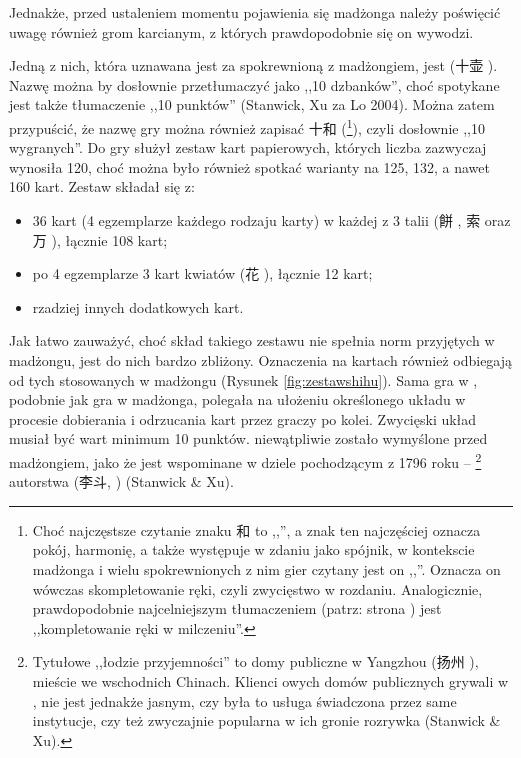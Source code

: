 Jednakże, przed ustaleniem momentu pojawienia się madżonga należy poświęcić
uwagę również grom karcianym, z których prawdopodobnie się on wywodzi.

Jedną z nich, która uznawana jest za spokrewnioną z madżongiem, jest
 (十壶 ). Nazwę można by dosłownie przetłumaczyć jako
,,10 dzbanków'', choć spotykane jest także tłumaczenie ,,10 punktów'' (Stanwick,
Xu za Lo 2004). Można zatem przypuścić, że nazwę gry można również zapisać 十和
(\footnote{Choć najczęstsze czytanie znaku 和 to ,,'', a
znak ten najczęściej oznacza pokój, harmonię, a także występuje w zdaniu jako
spójnik, w kontekscie madżonga i wielu spokrewnionych z nim gier czytany jest on
,,''. Oznacza on wówczas skompletowanie ręki, czyli zwycięstwo w
rozdaniu. Analogicznie, prawdopodobnie najcelniejszym tłumaczeniem 
(patrz: strona \pageref{mohu_page}) jest ,,kompletowanie ręki w milczeniu''.}),
czyli dosłownie ,,10 wygranych''. Do gry służył zestaw kart papierowych, których
liczba zazwyczaj wynosiła 120, choć można było również spotkać warianty na 125,
132, a nawet 160 kart. Zestaw składał się z:
\begin{itemize}
  \item 36 kart (4 egzemplarze każdego rodzaju karty) w każdej z 3 talii (餅
  , 索  oraz 万 ), łącznie 108 kart;
  \item po 4 egzemplarze 3 kart kwiatów (花 ), łącznie 12 kart;
  \item rzadziej innych dodatkowych kart.
\end{itemize}
Jak łatwo zauważyć, choć skład takiego zestawu nie spełnia norm przyjętych w
madżongu, jest do nich bardzo zbliżony. Oznaczenia na kartach również odbiegają
od tych stosowanych w madżongu (Rysunek \ref{fig:zestawshihu}).
Sama gra w , podobnie jak gra w madżonga, polegała na ułożeniu określonego układu w procesie
dobierania i odrzucania kart przez graczy po kolei. Zwycięski układ musiał być
wart minimum 10 punktów.  niewątpliwie zostało wymyślone przed
madżongiem, jako że jest wspominane w dziele pochodzącym z 1796 roku --
\label{li_dou}\footnote{Tytułowe
,,łodzie przyjemności'' to domy publiczne w Yangzhou (扬州 ), mieście we
wschodnich Chinach. Klienci owych domów publicznych grywali w ,
nie jest jednakże jasnym, czy była to usługa świadczona przez same instytucje,
czy też zwyczajnie popularna w ich gronie rozrywka (Stanwick \& Xu).}
autorstwa  (李斗, ) (Stanwick \& Xu).


